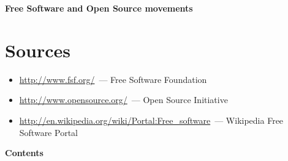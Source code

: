 \documentclass[10pt,a4paper]{article}
\newcommand{\bit}{\begin{itemize}\setlength{\itemsep}{-0.65mm}}
\newcommand{\eit}{\end{itemize}}
\begin{document}

\pagestyle{empty}
\pagestyle{fancy}
\cfoot{}

\begin{center}
{\LARGE \bfseries Free Software and Open Source movements}
\end{center}

\section*{Sources}
  \bit
    \item \url{http://www.fsf.org/}~--- Free Software Foundation
    \item \url{http://www.opensource.org/}~--- Open Source Initiative
    \item \url{http://en.wikipedia.org/wiki/Portal:Free_software}~--- Wikipedia Free Software Portal
  \eit

\begin{center}
{\Large \bfseries Contents}
\end{center}
\end{document}
